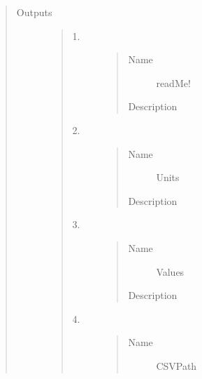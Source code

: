\documentclass[letterpaper,10pt,english]{sphinxmanual}
\begin{document}
\begin{quote}
\begin{description}
\item[{Outputs}] \leavevmode\begin{quote}\begin{description}
\item[{1.}] \leavevmode\begin{quote}\begin{description}
\item[{Name}] \leavevmode
readMe!

\item[{Description}] \leavevmode
{}

\end{description}\end{quote}

\item[{2.}] \leavevmode\begin{quote}\begin{description}
\item[{Name}] \leavevmode
Units

\item[{Description}] \leavevmode
{}

\end{description}\end{quote}

\item[{3.}] \leavevmode\begin{quote}\begin{description}
\item[{Name}] \leavevmode
Values

\item[{Description}] \leavevmode
{}

\end{description}\end{quote}

\item[{4.}] \leavevmode\begin{quote}\begin{description}
\item[{Name}] \leavevmode
CSVPath


\end{description}
\end{quote}
\end{description}
\end{quote}
\end{description}
\end{quote}
\end{document}

